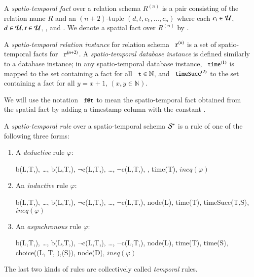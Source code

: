 A {\em spatio-temporal fact} over a relation schema $R^{(n)}$ is a pair consisting of the relation name $R$ and an $(n+2)$-tuple $(d,t,c_1,\ldots,c_n)$ where each $c_i \in \univ$, $d \in \univ, t \in \univ$, , and .  We denote a spatial fact over $R^{(n)}$ by .

A {\em spatio-temporal relation instance} for relation schema $\dedalus{r}^{(n)}$ is a set of spatio-temporal facts for
$\dedalus{r}^{(n+2)}$.  A {\em spatio-temporal database instance} is defined similarly to a database instance; in any spatio-temporal database instance, $\dedalus{time}^{(1)}$ is mapped to the set containing a  fact for all $\dedalus{t} \in \mathbb{N}$, and $\dedalus{timeSucc}^{(2)}$ to the set containing a  fact for all $y = x + 1$, $(x,y \in \mathbb{N})$.

We will use the notation $\dedalus{f@t}$ to mean the spatio-temporal fact obtained from the spatial fact  by adding a timestamp column with the constant .

A {\em spatio-temporal rule} over a spatio-temporal schema $\stschema$ is a rule of one of the following three forms:

\begin{enumerate}
\item 
A {\em deductive} rule $\varphi$:

\begin{Drules}
        {b(L,T,), \ldots, b(L,T,), $\lnot$c(L,T,), \ldots, $\lnot$c(L,T,), , time(T), \(ineq(\varphi)\)}
\end{Drules}
\item 
An {\em inductive} rule $\varphi$:

\begin{Drules}
        {b(L,T,), \ldots, b(L,T,), $\lnot$c(L,T,), \ldots, $\lnot$c(L,T,), node(L), time(T), timeSucc(T,S), \(ineq(\varphi)\)}
\end{Drules}
\item 
An {\em asynchronous} rule $\varphi$:

\begin{Drules}
        {b(L,T,), \ldots, b(L,T,),
          $\lnot$c(L,T,), \ldots, $\lnot$c(L,T,),
          node(L), time(T), time(S), choice((L, T, ),(S)), node(D), \(ineq(\varphi)\)}
\end{Drules}
\end{enumerate}
The last two kinds of rules are collectively called {\em temporal} rules.

